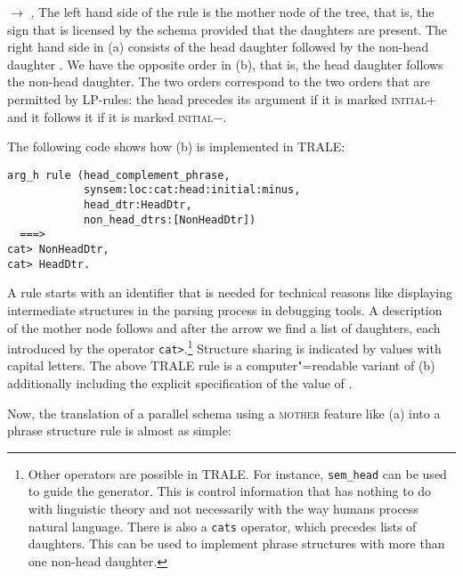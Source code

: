 \ex {} $\to$ , 
\zl
The left hand side of the rule is the mother node of the tree, that is, the sign that is licensed by
the schema provided that the daughters are present. The right hand side in (a) consists of
the head daughter  followed by the non-head daughter . We have the opposite order
in (b), that is, the head daughter follows the non-head daughter. The two orders correspond
to the two orders that are permitted by LP-rules: the head precedes its argument if it is marked
\textsc{initial}+ and it follows it if it is marked \textsc{initial}$-$.

The following code shows how (b) is implemented in TRALE:
\begin{verbatim}
arg_h rule (head_complement_phrase,
            synsem:loc:cat:head:initial:minus,
            head_dtr:HeadDtr,
            non_head_dtrs:[NonHeadDtr])
  ===>
cat> NonHeadDtr,
cat> HeadDtr.
\end{verbatim}
\largerpage
A rule starts with an identifier that is needed for technical reasons like displaying intermediate
structures in the parsing process in debugging tools. A description of the mother node follows and
after the arrow we find a list of daughters, each introduced by the operator \verb+cat>+.\footnote{%
  Other operators are possible in TRALE. For instance, \texttt{sem\_head} can be used to guide the
  generator. This is control information that has nothing to do with linguistic theory and not
  necessarily with the way humans process natural language. There is also a \texttt{cats} operator,
  which precedes lists of daughters. This can be used to implement phrase structures with more than
  one non-head daughter.%
}
Structure sharing is indicated by values with capital letters. The above TRALE rule is a
computer"=readable variant of (b) additionally including the explicit specification of the value of {\initial}.  

Now, the translation of a parallel schema using a \textsc{mother} feature like (a) into a phrase structure rule is almost as simple:
\eal
\ex {}

